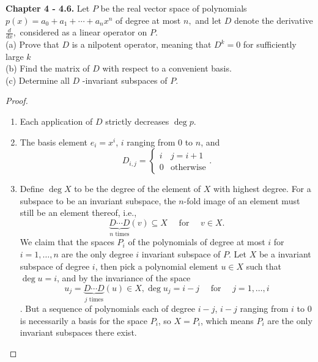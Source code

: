 \documentclass[10pt]{report}
\theoremstyle{definition}
\begin{document}
\textbf{Chapter 4 - 4.6.} Let $P$ be the real vector space of polynomials $p(x)=a_{0}+a_{1}+\cdots+a_{n} x^{n}$ of degree at most $n,$ and let $D$ denote the derivative $\frac{d}{d x},$ considered as a linear operator on $P .$\\
(a) Prove that $D$ is a nilpotent operator, meaning that $D^{k}=0$ for sufficiently large $k$\\
(b) Find the matrix of $D$ with respect to a convenient basis.\\
(c) Determine all $D$ -invariant subspaces of $P$.\\
\begin{proof}\leavevmode
\begin{enumerate}[label=(\alph*)]
\item Each application of $D$ strictly decreases $\deg p$.
\item The basis element $e_i=x^i$, $i$ ranging from $0$ to $n$, and
$$D_{i,j}=\begin{cases}
i&j=i+1\\
0&\text{otherwise}
\end{cases}.$$
\item
Define $\deg X$ to be the degree of the element of $X$ with highest degree.
For a subspace to be an invariant subspace, the $n$-fold image of an element must still be an element thereof, i.e.,
$$\underbrace{D\cdots D}_{n\text{ times}}(v)\subseteq X\quad\text{ for }\quad v\in X.$$
We claim that the spaces $P_i$ of the polynomials of degree at most $i$ for $i=1,\dots,n$ are the only degree $i$ invariant subspace of $P$.
Let $X$ be a invariant subspace of degree $i$, then pick a polynomial element $u\in X$ such that $\deg u=i$, and by the invariance of the space
$$u_j=\underbrace{D\cdots D}_{j\text{ times}}(u)\in X,\deg u_j=i-j\quad\text{ for }\quad j=1,\dots,i$$. But a sequence of polynomials each of degree $i-j$, $i-j$ ranging from $i$ to $0$ is necessarily a basis for the space $P_i$, so $X=P_i$, which means $P_i$ are the only invariant subspaces there exist.





\end{enumerate}
\end{proof}
\end{document}
